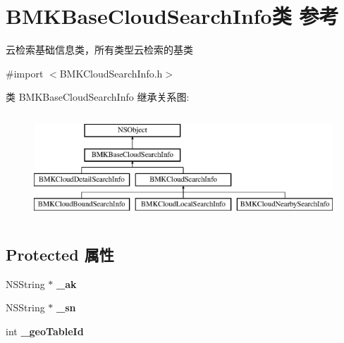 \hypertarget{interface_b_m_k_base_cloud_search_info}{}\section{B\+M\+K\+Base\+Cloud\+Search\+Info类 参考}
\label{interface_b_m_k_base_cloud_search_info}


云检索基础信息类，所有类型云检索的基类  




{\ttfamily \#import $<$B\+M\+K\+Cloud\+Search\+Info.\+h$>$}

类 B\+M\+K\+Base\+Cloud\+Search\+Info 继承关系图\+:\begin{figure}[H]
\begin{center}
\leavevmode
\includegraphics[height=4.000000cm]{interface_b_m_k_base_cloud_search_info}
\end{center}
\end{figure}
\subsection*{Protected 属性}
\begin{DoxyCompactItemize}
\item 
\hypertarget{interface_b_m_k_base_cloud_search_info_a7e0ee4faf41da0365d2f427b677f621a}{}N\+S\+String $\ast$ {\bfseries \+\_\+ak}\label{interface_b_m_k_base_cloud_search_info_a7e0ee4faf41da0365d2f427b677f621a}

\item 
\hypertarget{interface_b_m_k_base_cloud_search_info_a2c8bc1521f7025190278e3f29647c652}{}N\+S\+String $\ast$ {\bfseries \+\_\+sn}\label{interface_b_m_k_base_cloud_search_info_a2c8bc1521f7025190278e3f29647c652}

\item 
\hypertarget{interface_b_m_k_base_cloud_search_info_a3d23b81d16c3054a5b73c2f017b435c3}{}int {\bfseries \+\_\+geo\+Table\+Id}\label{interface_b_m_k_base_cloud_search_info_a3d23b81d16c3054a5b73c2f017b435c3}

\end{DoxyCompactItemize}
